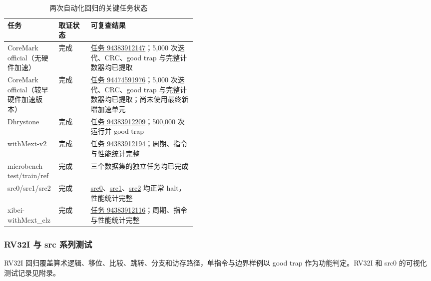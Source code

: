 \begin{table}[H]\centering
\caption{两次自动化回归的关键任务状态}\label{tab:actions-status}
\scriptsize
\begin{tabularx}{\linewidth}{@{}p{0.27\linewidth}p{0.17\linewidth}Y@{}}\toprule
\textbf{任务}&\textbf{取证状态}&\textbf{可复查结果}\\\midrule
CoreMark official（无硬件加速）&完成&\href{https://github.com/HanPiM/jyd/actions/runs/31680203475/job/94383912147}{任务 94383912147}；5,000 次迭代、CRC、good trap 与完整计数器均已提取\\
CoreMark official（较早硬件加速版本）&完成&\href{https://github.com/HanPiM/jyd/actions/runs/31708291526/job/94474591976}{任务 94474591976}；5,000 次迭代、CRC、good trap 与完整计数器均已提取；尚未使用最终新增加速单元\\
Dhrystone&完成&\href{https://github.com/HanPiM/jyd/actions/runs/31680203475/job/94383912209}{任务 94383912209}；500,000 次运行并 good trap\\
withMext-v2&完成&\href{https://github.com/HanPiM/jyd/actions/runs/31680203475/job/94383912194}{任务 94383912194}；周期、指令与性能统计完整\\
microbench test/train/ref&完成&三个数据集的独立任务均已完成\\
src0/src1/src2&完成&\href{https://github.com/HanPiM/jyd/actions/runs/31680203475/job/94383912255}{src0}、\href{https://github.com/HanPiM/jyd/actions/runs/31680203475/job/94383912123}{src1}、\href{https://github.com/HanPiM/jyd/actions/runs/31680203475/job/94383912165}{src2} 均正常 halt，性能统计完整\\
xibei-withMext\_clz&完成&\href{https://github.com/HanPiM/jyd/actions/runs/31680203475/job/94383912116}{任务 94383912116}；周期、指令与性能统计完整\\
\bottomrule\end{tabularx}
\end{table}

\subsubsection{RV32I 与 src 系列测试}

RV32I 回归覆盖算术逻辑、移位、比较、跳转、分支和访存路径，单指令与边界样例以
good trap 作为功能判定。RV32I 和 src0 的可视化测试记录见附录。

